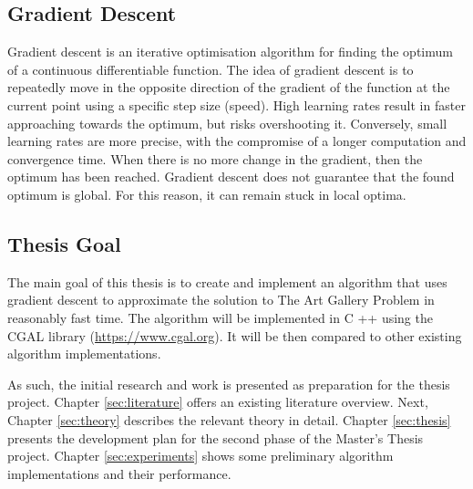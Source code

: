 \subsection{Gradient Descent}

Gradient descent is an iterative optimisation algorithm for finding the optimum of a continuous differentiable function. The idea of gradient descent is to repeatedly move in the opposite direction of the gradient of the function at the current point using a specific step size (speed). High learning rates result in faster approaching towards the optimum, but risks overshooting it. Conversely, small learning rates are more precise, with the compromise of a longer computation and convergence time. 
When there is no more change in the gradient, then the optimum has been reached. Gradient descent does not guarantee that the found optimum is global. For this reason, it can remain stuck in local optima.

\subsection{Thesis Goal}

The main goal of this thesis is to create and implement an algorithm that uses gradient descent to approximate the solution to The Art Gallery Problem \cite{o1987art} in reasonably fast time. The algorithm will be implemented in C ++ using the CGAL library (\url{https://www.cgal.org}). It will be then compared to other existing algorithm implementations.

As such, the initial research and work is presented as preparation for the thesis project. Chapter \ref{sec:literature} offers an existing literature overview. Next, Chapter \ref{sec:theory} describes the relevant theory in detail.
Chapter \ref{sec:thesis} presents the development plan for the second phase of the Master's Thesis project.
Chapter \ref{sec:experiments} shows some preliminary algorithm implementations and their performance.